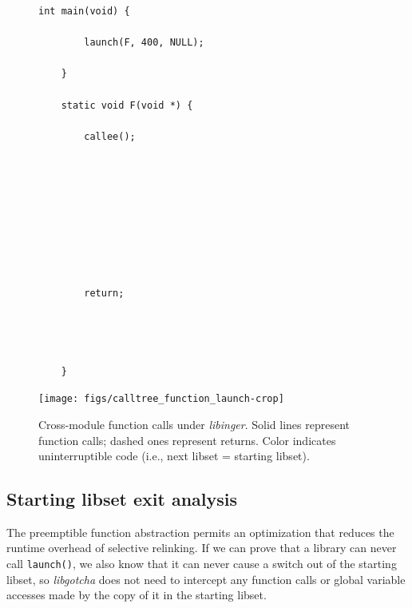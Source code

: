 \begin{figure}
	\begin{minipage}{0.25\textwidth}
	\begin{lstlisting}[basicstyle=\footnotesize\ttfamily,tabsize=2,gobble=2]
	int main(void) {

		launch(F, 400, NULL);

	}

	static void F(void *) {

		callee();









		return;




	}
	\end{lstlisting}
	\end{minipage}
%
	\begin{minipage}{0.75\textwidth}
	\texttt{[image: figs/calltree\_function\_launch-crop]}
	\end{minipage}
\caption[Cross-module function calls under \textit{libinger}]{
Cross-module function calls under \textit{libinger}. Solid lines represent function
calls; dashed ones represent returns. Color indicates uninterruptible code (i.e.,
next libset = starting libset).}
\label{fig:ingerhook}
\end{figure}


\subsection{Starting libset exit analysis}
\label{sec:libinger:exitanalysis}

The preemptible function abstraction permits an optimization that reduces the runtime
overhead of selective relinking.  If we can prove that a library can never call
\texttt{launch()}, we also know that it can never cause a switch out of the starting
libset, so \textit{libgotcha} does not need to intercept any function calls or global
variable accesses made by the copy of it in the starting libset.

